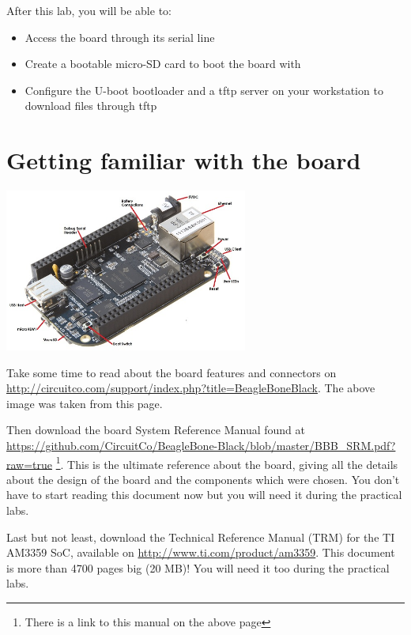 
After this lab, you will be able to:
\begin{itemize}
\item Access the board through its serial line
\item Create a bootable micro-SD card to boot the 
      board with
\item Configure the U-boot bootloader and a tftp server
      on your workstation to download files through tftp
\end{itemize}

\section{Getting familiar with the board}

\begin{center}
\includegraphics[width=8cm]{labs/kernel-board-setup/beaglebone-black-connectors.jpg}
\end{center}

Take some time to read about the board features and connectors on
\url{http://circuitco.com/support/index.php?title=BeagleBoneBlack}. The
above image was taken from this page.

Then download the board System Reference Manual found at 
\url{https://github.com/CircuitCo/BeagleBone-Black/blob/master/BBB_SRM.pdf?raw=true}
\footnote{There is a link to this manual on the above page}.
This is the ultimate reference about the board, giving all the details
about the design of the board and the components which were chosen.
You don't have to start reading this document now but you will need it
during the practical labs.

Last but not least, download the Technical Reference Manual (TRM) for
the TI AM3359 SoC, available on \url{http://www.ti.com/product/am3359}.
This document is more than 4700 pages big (20 MB)! You will need it
too during the practical labs. 

